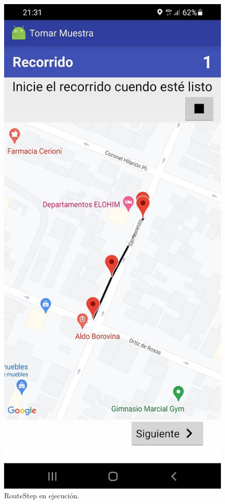 \begin{figure}[H]
  \centering
    \includegraphics[scale=0.3]{50-anexos/C-steps/route_screen.jpg} 
    \caption{RouteStep en ejecución.}
\end{figure}


